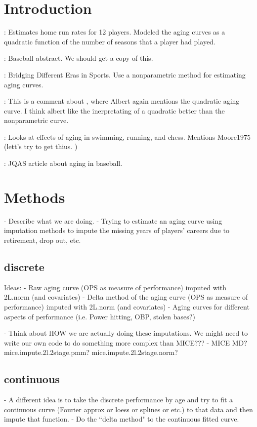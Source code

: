 \documentclass{article}\usepackage[]{graphicx}\usepackage[]{color}
\begin{document}
\section{Introduction}
\cite{Albert1992}: Estimates home run rates for 12 players.  Modeled the aging curves as a quadratic function of the number of seasons that a player had played.  


\cite{James1982}: Baseball abstract.  We should get a copy of this.  

\cite{BerryEtAl1999}: Bridging Different Eras in Sports.  Use a nonparametric method for estimating aging curves.  

\cite{Albert1999}:  This is a comment about \cite{BerryEtAl1999}, where Albert again mentions the quadratic aging curve. I think albert like the inerpretating of a quadratic better than the nonparametric curve.   

\cite{Fair2007}: Looks at effects of aging in swimming, running, and chess. 
Mentions Moore1975 (lett's try to get thius.  )

\cite{Fair2008}: JQAS article about aging in baseball.  

\section{Methods}
- Describe what we are doing.  
- Trying to estimate an aging curve using imputation methods to impute the missing years of players' careers due to retirement, drop out, etc.  

\subsection{discrete}
Ideas: 
- Raw aging curve (OPS as measure of performance) imputed with 2L.norm (and covariates)
- Delta method of the aging curve (OPS as measure of performance) imputed with 2L.norm (and covariates)
- Aging curves for different aspects of performance (i.e. Power hitting, OBP, stolen bases?)

- Think about HOW we are actually doing these imputations.  We might need to write our own code to do something more complex than MICE???
- MICE MD?  mice.impute.2l.2stage.pmm?  mice.impute.2l.2stage.norm?

\subsection{continuous}
- A different idea is to take the discrete performance by age and try to fit a continuous curve (Fourier approx or loess or splines or etc.) to that data and then impute that function.  
- Do the ``delta method" to the continuous fitted curve.  
\end{document}
